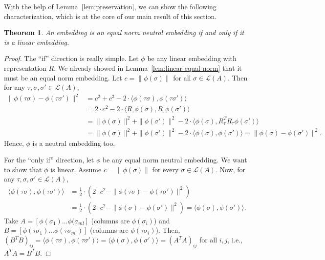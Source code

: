 \documentclass[10pt,letterpaper]{article}
\newcommand{\calL}{{\mathcal{L}}}
\newcommand{\rank}{{\calL(A)}}
\newtheorem{theorem}{Theorem}
\begin{document}

With the help of Lemma~\ref{lem:preservation}, we can show the following characterization, which is at the core of our main result of this section.
\begin{theorem}
An embedding is an equal norm neutral embedding if and only if it is a linear embedding.
\label{thm:neutral-linear}
\end{theorem}
\begin{proof}
The ``if'' direction is really simple. Let $\phi$ be any linear embedding with representation $R$. We already showed in Lemma~\ref{lem:linear-equal-norm} that it must be an equal norm embedding. Let $c = \|\phi(\sigma)\|$ for all $\sigma \in \rank$. Then for any $\tau,\sigma,\sigma' \in \rank$,
\begin{align*}
\|\phi(\tau \sigma)-\phi(\tau \sigma')\|^2 &= c^2 + c^2 - 2\cdot \langle \phi(\tau \sigma), \phi(\tau \sigma') \rangle \\
&= 2 \cdot c^2 - 2 \cdot \langle R_{\tau}\phi(\sigma), R_{\tau}\phi(\sigma') \rangle \\
&= \|\phi(\sigma)\|^2 + \|\phi(\sigma')\|^2 - 2 \cdot \langle \phi(\sigma), R_{\tau}^T R_{\tau}\phi(\sigma') \rangle \\
&= \|\phi(\sigma)\|^2 + \|\phi(\sigma')\|^2 - 2 \cdot \langle \phi(\sigma), \phi(\sigma') \rangle = \|\phi(\sigma)-\phi(\sigma')\|^2.
\end{align*}
Hence, $\phi$ is a neutral embedding too.

For the ``only if'' direction, let $\phi$ be any equal norm neutral embedding. We want to show that $\phi$ is linear. Assume $c = \|\phi(\sigma)\|$ for every $\sigma \in \rank$. Now, for any $\tau,\sigma,\sigma' \in \rank$,
\begin{align*}
\langle \phi(\tau \sigma), \phi(\tau \sigma') \rangle &= \frac{1}{2} \cdot \left(2\cdot c^2 - \|\phi(\tau \sigma) - \phi(\tau \sigma')\|^2\right) \\
&= \frac{1}{2} \cdot \left(2\cdot c^2 - \|\phi(\sigma) - \phi(\sigma')\|^2\right) = \langle \phi(\sigma), \phi(\sigma') \rangle.
\end{align*}
Take $A = [\phi(\sigma_1) \ldots \phi(\sigma_{m!}]$ (columns are $\phi(\sigma_i)$) and $B = [\phi(\tau \sigma_1) \ldots \phi(\tau \sigma_{m!})]$ (columns are $\phi(\tau \sigma_i)$). Then, $(B^T B)_{ij} = \langle \phi(\tau \sigma), \phi(\tau \sigma') \rangle = \langle \phi(\sigma), \phi(\sigma') \rangle = (A^T A)_{ij}$ for all $i,j$, i.e., $A^T A = B^T B$. 


\end{proof}
\end{document}
